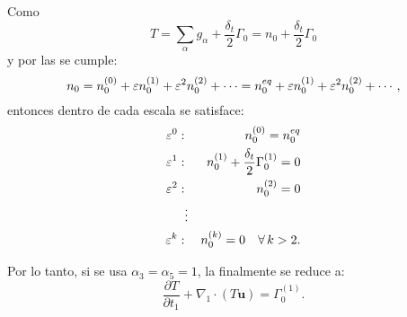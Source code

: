 Como
\begin{equation}
	T = \sum_{\alpha} g_{\alpha} + \dfrac{\delta_t}{2} \Gamma_0 = n_0 + \dfrac{\delta_t}{2} \Gamma_0
\end{equation}
y por las  se cumple:
\begin{equation}
	n_0 = n_{0}^{(0)} + \varepsilon n_{0}^{(1)} + \varepsilon^2 n_{0}^{(2)} + \cdots = n_0^{eq} + \varepsilon n_{0}^{(1)} + \varepsilon^2 n_{0}^{(2)} + \cdots,
\end{equation}
entonces dentro de cada escala se satisface:
\begin{equation}
	\begin{aligned}
		\varepsilon^0: && n_{0}^{(0)} = n_0^{eq} \\
		\varepsilon^1: && n_{0}^{(1)} + \dfrac{\delta_t}{2} \Gamma_0^{(1)} = 0\\
		\varepsilon^2: && n_{0}^{(2)} = 0 \\
		&\vdots& \\
		\varepsilon^k: && n_{0}^{(k)} = 0 \quad \forall \, k > 2.
	\end{aligned}
\end{equation}

Por lo tanto, si se usa $\alpha_3 = \alpha_5 = 1$, la  finalmente se reduce a:
\begin{equation}
	\dfrac{\partial T}{\partial t_1} + \nabla_1 \cdot (T\bm{u}) = \Gamma_0^{(1)}.
\end{equation}